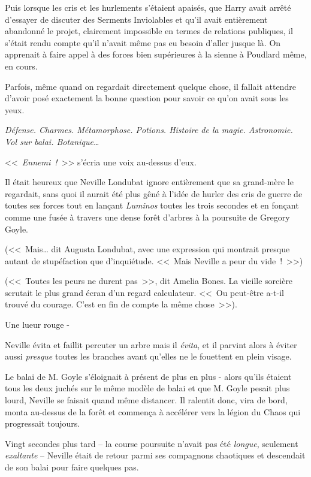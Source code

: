 Puis lorsque les cris et les hurlements s'étaient apaisés, que Harry avait arrêté d'essayer de discuter des Serments Inviolables et qu'il avait entièrement abandonné le projet, clairement impossible en termes de relations publiques, il s'était rendu compte qu'il n'avait même pas eu besoin d'aller jusque là. On apprenait à faire appel à des forces bien supérieures à la sienne à Poudlard même, en cours.

Parfois, même quand on regardait directement quelque chose, il fallait attendre d'avoir posé exactement la bonne question pour savoir ce qu'on avait sous les yeux.

\emph{Défense. Charmes. Métamorphose. Potions. Histoire de la magie. Astronomie. Vol sur balai. Botanique…}

<<~\emph{Ennemi~!}~>> s'écria une voix au-dessus d'eux.

\later

Il était heureux que Neville Londubat ignore entièrement que sa grand-mère le regardait, sans quoi il aurait été plus gêné à l'idée de hurler des cris de guerre de toutes ses forces tout en lançant \emph{Luminos} toutes les trois secondes et en fonçant comme une fusée à travers une dense forêt d'arbres à la poursuite de Gregory Goyle.

(<<~Mais… dit Augusta Londubat, avec une expression qui montrait presque autant de stupéfaction que d'inquiétude. <<~Mais Neville a peur du vide~!~>>)

(<<~Toutes les peurs ne durent pas~>>, dit Amelia Bones. La vieille sorcière scrutait le plus grand écran d'un regard calculateur. <<~Ou peut-être a-t-il trouvé du courage. C'est en fin de compte la même chose~>>).

Une lueur rouge -

Neville évita et faillit percuter un arbre mais il \emph{évita}, et il parvint alors à éviter aussi \emph{presque} toutes les branches avant qu'elles ne le fouettent en plein visage.

Le balai de M. Goyle s'éloignait à présent de plus en plus - alors qu'ils étaient tous les deux juchés sur le même modèle de balai et que M. Goyle pesait plus lourd, Neville se faisait quand même distancer. Il ralentit donc, vira de bord, monta au-dessus de la forêt et commença à accélérer vers la légion du Chaos qui progressait toujours.

Vingt secondes plus tard -- la course poursuite n'avait pas été \emph{longue}, seulement \emph{exaltante} -- Neville était de retour parmi ses compagnons chaotiques et descendait de son balai pour faire quelques pas.


